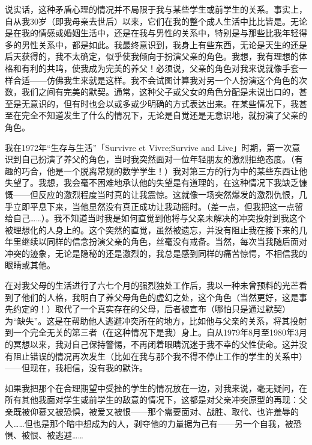 说实话，这种矛盾心理的情况并不局限于我与某些学生或前学生的关系。事实上，自从我30岁（即我母亲去世后）以来，它们在我的整个成人生活中比比皆是。无论是在我的情感或婚姻生活中，还是在我与男性的关系中，特别是与那些比我年轻得多的男性关系中，都是如此。我最终意识到，我身上有些东西，无论是天生的还是后天获得的，我不太确定，似乎使我倾向于扮演父亲的角色。我想，我有理想的体格和有利的共鸣，使我成为完美的养父！必须说，父亲的角色对我来说就像手套一样合适——仿佛我生来就是这样。我不会试图计算我对另一个人扮演这个角色的次数，我们之间有完美的默契。通常，这种父子或父女的角色分配是未说出口的，甚至是无意识的，但有时也会以或多或少明确的方式表达出来。在某些情况下，我甚至在完全不知道发生了什么的情况下，无论是自觉还是无意识地，就扮演了父亲的角色。

我在1972年“生存与生活”「Survivre et Vivre;Survive and Live」时期，第一次意识到自己扮演了养父的角色，当时我突然面对一位年轻朋友的激烈拒绝态度。（有趣的巧合，他是一个脱离常规的数学学生！）我对第三方的行为中的某些东西让他失望了。我想，我会毫不困难地承认他的失望是有道理的，在这种情况下我缺乏慷慨——但反应的激烈程度当时真的让我震惊。这就像一场突然爆发的激烈仇恨，几乎立即平息下来，当他显然没有真正成功让我动摇时。（差一点，但我把这一点留给自己……）。我不知道当时我是如何直觉到他将与父亲未解决的冲突投射到我这个被理想化的人身上的。这个突然的直觉，虽然被遗忘，并没有阻止我在接下来的几年里继续以同样的信念扮演父亲的角色，丝毫没有戒备。当然，每次当我随后面对冲突的迹象，无论是隐秘的还是激烈的，我总是感到同样的痛苦惊愕，不相信我的眼睛或其他。

在对我父母的生活进行了六七个月的强烈独处工作后，我以一种未曾预料的光芒看到了他们的人格，我明白了养父母角色的虚幻之处，这个角色（当然更好，这是事先约定的！）取代了一个真实存在的父母，后者被宣布（哪怕只是通过默契）为“缺失”。这是在帮助他人逃避冲突所在的地方，比如他与父亲的关系，将其投射到一个完全无关的第三者（在这种情况下是我）身上。自从1979年8月至1980年3月的冥想以来，我对自己保持警惕，不再闭着眼睛沉迷于我不幸的父性使命。这并没有阻止错误的情况再次发生（比如在我与那个我不得不停止工作的学生的关系中）——但现在，我相信，没有我的默许。

如果我把那个在合理期望中受挫的学生的情况放在一边，对我来说，毫无疑问，在所有其他我面对学生或前学生的敌意的情况下，这都是对父亲冲突原型的再现：父亲既被仰慕又被恐惧，被爱又被恨——那个需要面对、战胜、取代、也许羞辱的人……但也是那个暗中想成为的人，剥夺他的力量据为己有——另一个自我，被恐惧、被恨、被逃避……